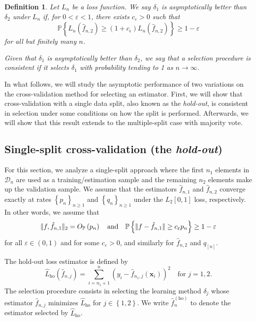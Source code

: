 \documentclass[11pt, letter paper]{article}
\newcommand{\1}{\mathmybb{1}}
\newtheorem{definition}{Definition}[section]
\newcommand{\0}{\emptyset}
\newcommand{\prob}{\mathbb{P}}
\newcommand{\paren}[1]{\left(#1 \right)}
\newcommand{\set}[1]{\left\{ #1 \right\}}
\newcommand{\norm}[1]{|\hspace{-1pt}|#1 |\hspace{-1pt}|}
\newcommand{\data}{\mathcal{D}_{n}}
\newcommand{\x}{\boldsymbol{x}}
\newcommand{\Loss}[1]{L_{n}\paren{#1}}
\newcommand{\ho}{\hat{L}_{\mathrm{ho}}}
\newcommand{\Op}[1]{O_{\prob}\paren{#1}}
\newcommand{\fhat}[2]{\hat{f}_{#1, #2}}
\newcommand{\fho}{\hat{f}^{(\mathrm{ho})}_{n}}
\begin{document}
\begin{definition}
    Let \(L_{n}\) be a loss function. We say \(\delta_{1}\) is \emph{asymptotically better} than \(\delta_{2}\) under \(L_{n}\) if, for \(0<\varepsilon<1\), there exists \(c_{\varepsilon}>0\) such that
    \[\prob\set{\Loss{\fhat{n}{2}}\geq (1+c_{\epsilon})\Loss{\fhat{n}{2}} }\geq 1-\varepsilon\]
    for all but finitely many \(n\).

    Given that \(\delta_{1}\) is asymptotically better than \(\delta_{2}\), we say that a selection procedure is consistent if it selects \(\delta_{1}\) with probability tending to 1 as \(n\to\infty\).
\end{definition}

In what follows, we will study the asymptotic performance of two variations on the cross-validation method for selecting an estimator. First, we will show that cross-validation with a single data split, also known as the \emph{hold-out}, is consistent in selection under some conditions on how the split is performed. Afterwards, we will show that this result extends to the multiple-split case with majority vote.

\subsection{Single-split cross-validation (the \emph{hold-out})}

For this section, we analyze a single-split approach where the first \(n_1\) elements in \(\data\) are used as a training/estimation sample and the remaining \(n_2\) elements make up the validation sample. We assume that the estimators \(\fhat{n}{1}\) and \(\fhat{n}{2}\) converge exactly at rates \(\set{p_{n}}_{n\geq 1}\) and \(\set{q_{n}}_{n\geq 1}\) under the \(L_{2}[0,1]\) loss, respectively. In other words, we assume that
\[\norm{f, \fhat{n}{1}}_{2} = \Op{p_{n}} \quad\text{and}\quad \prob\set{\norm{f-\fhat{n}{1}} \geq c_{\varepsilon}p_{n}} \geq 1-\varepsilon\]
for all \(\varepsilon\in(0,1)\) and for some \(c_{\varepsilon}>0\), and similarly for \(\fhat{n}{2}\) and \(q_[n]\).

The hold-out loss estimator is defined by
\begin{equation}\label{def:holoss}
    \ho(\fhat{n}{j}) = \sum_{i=n_{1}+1}^{n}\paren{y_{i} - \fhat{n_{1}}{j}(\x_{i})}^{2}\quad\text{for }j=1,2.
\end{equation}
The selection procedure consists in selecting the learning method \(\delta_{j}\) whose estimator \(\fhat{n}{j}\) minimizes \(\ho\) for \(j\in\set{1,2}\). We write \(\fho\) to denote the estimator selected by \(\ho\).
\end{document}
